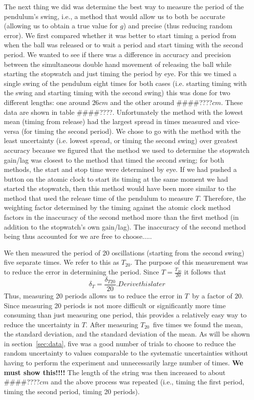 \documentclass[iop,numberedappendix,appendixfloats]{emulateapj}
\def\g{$g$}
\def\T{$T$}
\def\Ttwen{$T_{20}$}
\def\fillin{\#\#\#\#????}
\begin{document}
The next thing we did was determine the best way to measure the period of the 
pendulum's swing, i.e., a method that would allow us to both be accurate 
(allowing us to obtain a true value for \g) and precise (thus reducing random 
error). We first compared whether it was better to start timing a period from 
when the ball was released or to wait a period and start timing with the 
second period.  We wanted to see if there was a difference in accuracy and 
precision between the simultaneous double hand movement of releasing the ball 
while starting the stopwatch and just timing the period by eye. For this we 
timed a single swing of the pendulum eight times for both cases (i.e. starting 
timing with the swing and starting timing with the second swing) this was done 
for two different lengths: one around $26cm$ and the other around \fillin$cm$. 
These data are shown in table \fillin. Unfortunately the method with the lowest 
mean (timing from release) had the largest spread in times measured and 
vice-versa (for timing the second period). We chose to go 
with the method with the least uncertainty (i.e. lowest spread, or timing the 
second swing) over greatest accuracy because we figured that the method we 
used to determine the stopwatch gain/lag was closest to the method that timed 
the second swing; for both methods, the start and stop time were determined by 
eye.  If we had pushed a button on the atomic clock to start its timing at the 
same moment we had started the stopwatch, then this method would have been 
more similar to the method that used the release time of the pendulum to 
measure \T.  Therefore, the weighting factor determined by the timing against 
the atomic clock method factors in the inaccuracy of the second method more 
than the first method (in addition to the stopwatch's own gain/lag). The 
inaccuracy of the second method being thus accounted for we are free to choose..... 

We then measured the period of 20 oscillations (starting from the second 
swing) five separate times. We refer to this as $T_{20}$. The purpose of this 
measurement was to reduce the error in determining the period.  Since 
$T=\frac{T_{20}}{20}$ it follows that
\begin{equation}
\delta_T = \frac{\delta_{T20}}{20}.  Derive this later
\end{equation}
Thus, measuring 20 periods allows us to reduce the error in \T\ by a factor of 
$20$.  Since measuring 20 periods is not more difficult or significantly more 
time consuming than just measuring one period, this provides a relatively easy 
way to reduce the uncertainty in \T.  After measuring \Ttwen\ five times we 
found the mean, the standard deviation, and the standard deviation of the 
mean.  As will be shown in section~\ref{sec:data}, five was a good number of trials to 
choose to reduce the random uncertainty to values comparable to the systematic 
uncertainties without having to perform the experiment and unnecessarily large 
number of times. {\bf We must show this!!!!}  The length of the string was 
then increased to about \fillin $cm$ and the above process was repeated (i.e., 
timing the first period, timing the second period, timing 20 periods).
\end{document}
